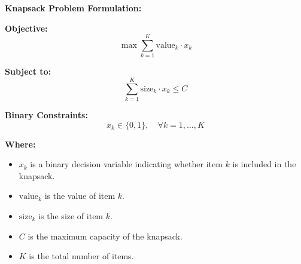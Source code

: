\documentclass{article}
\begin{document}
\textbf{Knapsack Problem Formulation:}

\textbf{Objective:}
\begin{equation}
\max \sum_{k=1}^{K} \text{value}_{k} \cdot x_{k}
\end{equation}

\textbf{Subject to:}
\begin{equation}
\sum_{k=1}^{K} \text{size}_{k} \cdot x_{k} \leq C 
\end{equation}

\textbf{Binary Constraints:}
\begin{equation}
x_{k} \in \{0, 1\}, \quad \forall k = 1, \ldots, K
\end{equation}

\textbf{Where:}
\begin{itemize}
    \item $x_{k}$ is a binary decision variable indicating whether item $k$ is included in the knapsack.
    \item $\text{value}_{k}$ is the value of item $k$.
    \item $\text{size}_{k}$ is the size of item $k$.
    \item $C$ is the maximum capacity of the knapsack.
    \item $K$ is the total number of items.
\end{itemize}
\end{document}
